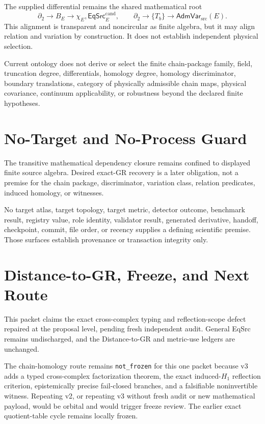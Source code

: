 \documentclass[11pt]{article}
\newcommand{\AdmVar}{\mathsf{AdmVar}_{\mathrm{src}}}
\newcommand{\EqCand}{\mathsf{EqSrc}^{\mathrm{cand}}}
\begin{document}
The supplied differential remains the shared mathematical root
\[
\partial_2\longrightarrow B_E\longrightarrow\chi_E,\EqCand_E,
\qquad
\partial_2\longrightarrow\{T_b\}\longrightarrow\AdmVar(E).
\]
This alignment is transparent and noncircular as finite algebra, but it may
align relation and variation by construction. It does not establish
independent physical selection.

Current ontology does not derive or select the finite chain-package family,
field, truncation degree, differentials, homology degree, homology
discriminator, boundary translations, category of physically admissible
chain maps, physical covariance, continuum applicability, or robustness
beyond the declared finite hypotheses.

\section{No-Target and No-Process Guard}

The transitive mathematical dependency closure remains confined to displayed
finite source algebra. Desired exact-GR recovery is a later obligation, not a
premise for the chain package, discriminator, variation class, relation
predicates, induced homology, or witnesses.

No target atlas, target topology, target metric, detector outcome, benchmark
result, registry value, role identity, validator result, generated derivative,
handoff, checkpoint, commit, file order, or recency supplies a defining
scientific premise. Those surfaces establish provenance or transaction
integrity only.

\section{Distance-to-GR, Freeze, and Next Route}

This packet claims the exact cross-complex typing and reflection-scope defect
repaired at the proposal level, pending fresh independent audit. General EqSrc
remains undischarged, and the Distance-to-GR and metric-use ledgers are
unchanged.

The chain-homology route remains \texttt{not\_frozen} for this one packet
because v3 adds a typed cross-complex factorization theorem, the exact
induced-\(H_1\) reflection criterion, epistemically precise fail-closed
branches, and a falsifiable noninvertible witness. Repeating v2, or repeating
v3 without fresh audit or new mathematical payload, would be orbital and
would trigger freeze review. The earlier exact quotient-table cycle remains
locally frozen.
\end{document}
